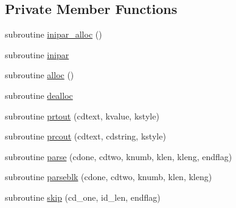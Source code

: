 \subsection*{Private Member Functions}
\begin{DoxyCompactItemize}
\item 
subroutine \hyperlink{classmod__oasis__namcouple_acb43892c17b5f8c8b360effb5a811c27}{inipar\+\_\+alloc} ()
\item 
subroutine \hyperlink{classmod__oasis__namcouple_a6da9d2285766ceb22ea8449f55201d84}{inipar}
\item 
subroutine \hyperlink{classmod__oasis__namcouple_a0d85a5dcb3fab17a680cceed332b9668}{alloc} ()
\item 
subroutine \hyperlink{classmod__oasis__namcouple_afaf98d4eb96cd6fbe191febd1efef8a4}{dealloc}
\item 
subroutine \hyperlink{classmod__oasis__namcouple_aee06276b65463fb85340dcc2ab9d67dc}{prtout} (cdtext, kvalue, kstyle)
\item 
subroutine \hyperlink{classmod__oasis__namcouple_a7c0f9c95bde8993d68aac2e7158e813c}{prcout} (cdtext, cdstring, kstyle)
\item 
subroutine \hyperlink{classmod__oasis__namcouple_a16fb5fe473d7aeb0cc4a3908b267485b}{parse} (cdone, cdtwo, knumb, klen, kleng, endflag)
\item 
subroutine \hyperlink{classmod__oasis__namcouple_a1078922274499dbda36db4dd1707d6de}{parseblk} (cdone, cdtwo, knumb, klen, kleng)
\item 
subroutine \hyperlink{classmod__oasis__namcouple_a75ba5c3a95a17e9c9af9c6e00e53c0f6}{skip} (cd\+\_\+one, id\+\_\+len, endflag)
\end{DoxyCompactItemize}
